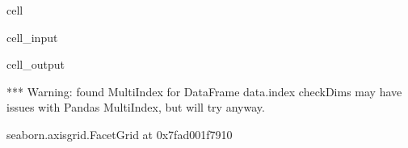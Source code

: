 \documentclass[letterpaper,table,10pt,english]{jupyterBook}
\begin{document}
\begin{sphinxuseclass}{cell}\begin{sphinxVerbatimInput}

\begin{sphinxuseclass}{cell_input}
\begin{sphinxVerbatim}[commandchars=\\\{\}]
  
     
                 
                     
\end{sphinxVerbatim}

\end{sphinxuseclass}\end{sphinxVerbatimInput}
\begin{sphinxVerbatimOutput}

\begin{sphinxuseclass}{cell_output}
\begin{sphinxVerbatim}[commandchars=\\\{\}]
*** Warning: found MultiIndex for DataFrame data.index \PYGZhy{} checkDims may have issues with Pandas MultiIndex, but will try anyway.
\end{sphinxVerbatim}

\begin{sphinxVerbatim}[commandchars=\\\{\}]
\PYGZlt{}seaborn.axisgrid.FacetGrid at 0x7fad001f7910\PYGZgt{}
\end{sphinxVerbatim}

\noindent{}

\end{sphinxuseclass}\end{sphinxVerbatimOutput}

\end{sphinxuseclass}
\end{document}
